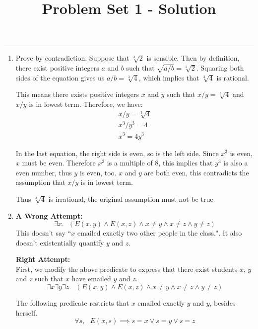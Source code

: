 \documentclass[11pt]{article}
\title{Problem Set 1 - Solution}
\begin{document}
\maketitle
\hrule\smallskip

\begin{enumerate}
\item %
  Prove by contradiction. Suppose that $\sqrt[3]{2}$ is sensible. Then
  by definition, there exist positive integers $a$ and $b$ such that
  $\sqrt{a/b} = \sqrt[3]{2}$. Squaring both sides of the equation gives us
  $a/b=\sqrt[3]{4}$, which implies that $\sqrt[3]{4}$ is
  rational. 

  This means there exists positive integers $x$ and $y$ such that
  $x/y=\sqrt[3]{4}$ and $x/y$ is in lowest term. Therefore, we have:
  \begin{align}
    x/y = \sqrt[3]{4} \\
    x^3/y^3 = 4 \\
    x^3 = 4y^3
  \end{align}

In the last equation, the right side is even, so is the left
side. Since $x^3$ is even, $x$ must be even. Therefore $x^3$ is a
multiple of 8, this implies that $y^3$ is also a even number, thus $y$
is even, too. $x$ and $y$ are both even, this contradicts the
assumption that $x/y$ is in lowest term. 

Thus $\sqrt[3]{4}$ is irrational, the original assumption must not be
true. 

\item %
  \textbf{A Wrong Attempt:}
  \begin{equation}
    \exists{x}. \text{  } (E(x,y) \land E(x,z) \land x \neq y \land x
    \neq z \land y \neq z)
  \end{equation}
  This doesn't say ``$x$ emailed exactly two other people in the
  class.". It also doesn't existentially quantify $y$ and $z$.

  \textbf{Right Attempt:} \\
  First, we modify the above predicate to express that there exist
  students $x$, $y$ and $z$ such that $x$ have emailed $y$ and $z$. 
  \begin{equation}
    \exists{x}\exists{y}\exists{z}. \text{  } (E(x,y) \land E(x,z)
    \land x \neq y \land x \neq z \land y \neq z)
  \end{equation}

  The following predicate restricts that $x$ emailed exactly $y$ and
  $y$, besides herself.
  \begin{equation}
    \forall{s}, \text{ } E(x,s) \implies s = x \lor s = y \lor s = z
  \end{equation}


\end{enumerate}
\end{document}
